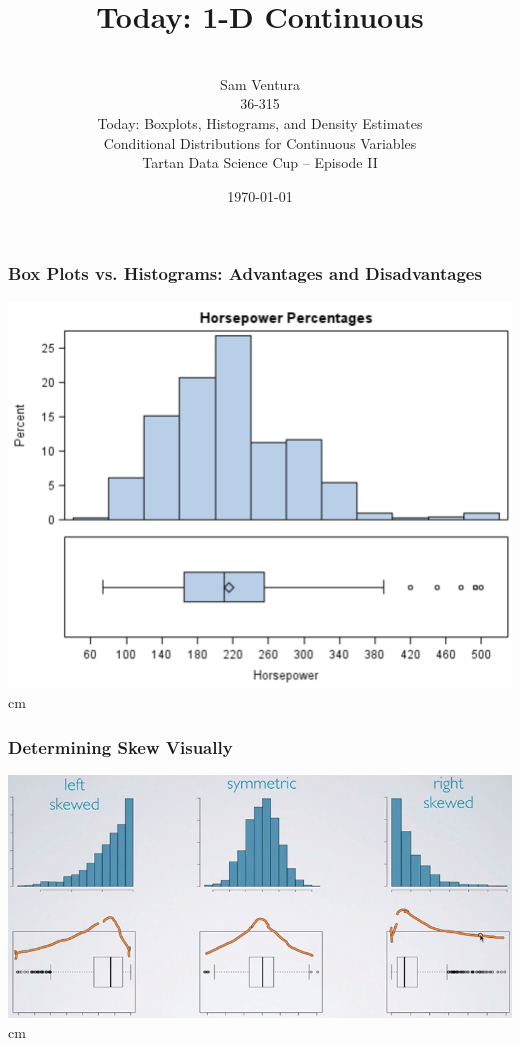 \documentclass{beamer} %
\begin{document}
\title[dedup]{Today:  1-D Continuous}


\author[Samuel L. Ventura]{\\
  \large{Sam Ventura\\36-315\\Today:  Boxplots, Histograms, and Density Estimates\\Conditional Distributions for Continuous Variables\\Tartan Data Science Cup -- Episode II}}
\date{\today}


\begin{frame}
	\maketitle
	
\end{frame}




\begin{frame}\frametitle{Box Plots vs. Histograms:  Advantages and Disadvantages}
	\includegraphics[width=0.66\linewidth]{bp-vs-hist.png}
	 cm
\end{frame}





\begin{frame}\frametitle{Determining Skew Visually}
	\includegraphics[width=\linewidth]{skew.png}
	 cm
\end{frame}
\end{document}
